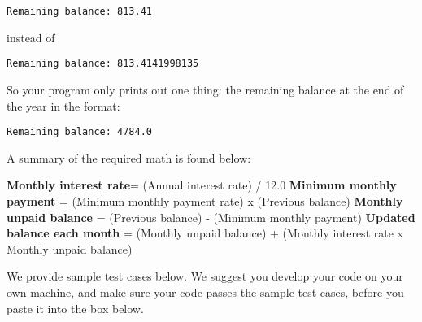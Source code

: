 \documentclass{article}
\begin{document}
  \verb|Remaining balance: 813.41|

  instead of

  \verb|Remaining balance: 813.4141998135|

  So your program only prints out one thing: the remaining balance at the end of
  the year in the format:

  \verb|Remaining balance: 4784.0|

  A summary of the required math is found below:

  \textbf{Monthly interest rate}= (Annual interest rate) / 12.0
  \textbf{Minimum monthly payment} = (Minimum monthly payment rate) x (Previous balance)
  \textbf{Monthly unpaid balance} = (Previous balance) - (Minimum monthly payment)
  \textbf{Updated balance each month} = (Monthly unpaid balance) + (Monthly interest rate
  x Monthly unpaid balance)

  We provide sample test cases below. We suggest you develop your code on your
  own machine, and make sure your code passes the sample test cases, before you
  paste it into the box below.

  \subsection*{}
\end{document}
